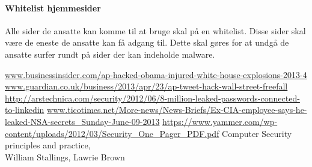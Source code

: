 \documentclass{article}
\begin{document}
\paragraph{Whitelist hjemmesider}
Alle sider de ansatte kan komme til at bruge skal på en whitelist. Disse sider skal være de
eneste de ansatte kan få adgang til. Dette skal gøres for at undgå de ansatte surfer rundt 
på sider der kan indeholde malware.

\newpage
\begin{thebibliography}{100}


\url{www.businessinsider.com/ap-hacked-obama-injured-white-house-explosions-2013-4}
\url{www.guardian.co.uk/business/2013/apr/23/ap-tweet-hack-wall-street-freefall}
\url{http://arstechnica.com/security/2012/06/8-million-leaked-passwords-connected-to-linkedin}
\url{www.ticotimes.net/More-news/News-Briefs/Ex-CIA-employee-says-he-leaked-NSA-secrets_Sunday-June-09-2013}
\url{https://www.yammer.com/wp-content/uploads/2012/03/Security_One_Pager_PDF.pdf}
    Computer Security principles and practice,\\
    William Stallings, Lawrie Brown
\end{thebibliography}
\end{document}
